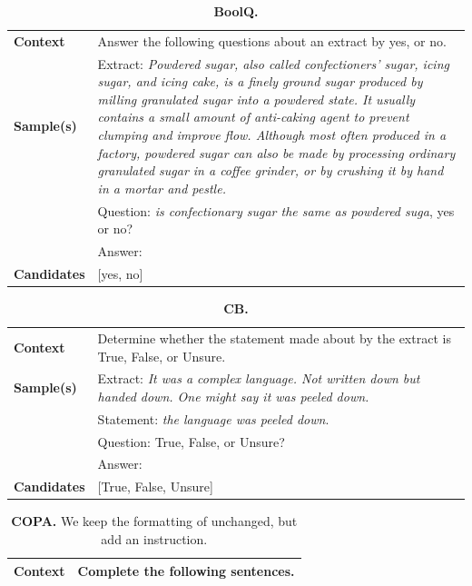 \documentclass{article}
\begin{document}
\begin{table}[h]
\caption{\textbf{BoolQ.}}
\begin{tabular}{lp{11.5cm}}
\toprule
\textbf{Context}   & Answer the following questions about an extract by yes, or no.\\
\textbf{Sample(s)} & Extract: \emph{Powdered sugar, also called confectioners' sugar, icing sugar, and icing cake, is a finely ground sugar produced by milling granulated sugar into a powdered state. It usually contains a small amount of anti-caking agent to prevent clumping and improve flow. Although most often produced in a factory, powdered sugar can also be made by processing ordinary granulated sugar in a coffee grinder, or by crushing it by hand in a mortar and pestle.} \\
& Question: \emph{is confectionary sugar the same as powdered suga}, yes or no? \\
& Answer:\\
\textbf{Candidates}   & {[}yes, no{]}         \\ \bottomrule                                                 
\end{tabular}
\end{table}


\begin{table}[h]
\caption{\textbf{CB.}}
\begin{tabular}{lp{11.5cm}}
\toprule
\textbf{Context}   & Determine whether the statement made about by the extract is True, False, or Unsure.\\
\textbf{Sample(s)} & Extract: \emph{It was a complex language. Not written down but handed down. One might say it was peeled down.} \\
& Statement: \emph{the language was peeled down}. \\
& Question: True, False, or Unsure? \\
& Answer:\\
\textbf{Candidates}   & {[}True, False, Unsure{]}         \\ \bottomrule                                                 
\end{tabular}
\end{table}

\begin{table}[h]
\caption{\textbf{COPA.} We keep the formatting of \citet{eval-harness} unchanged, but add an instruction.}
\begin{tabular}{lp{11.5cm}}
\toprule
\textbf{Context}   & Complete the following sentences.\\ \bottomrule                                                 
\end{tabular}
\end{table}
\end{document}
